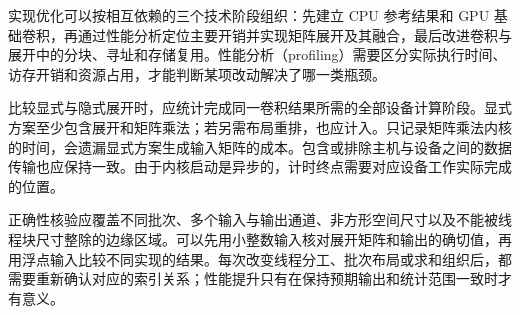 实现优化可以按相互依赖的三个技术阶段组织：先建立 CPU 参考结果和 GPU 基础卷积，再通过性能分析定位主要开销并实现矩阵展开及其融合，最后改进卷积与展开中的分块、寻址和存储复用。性能分析（profiling）需要区分实际执行时间、访存开销和资源占用，才能判断某项改动解决了哪一类瓶颈。

比较显式与隐式展开时，应统计完成同一卷积结果所需的全部设备计算阶段。显式方案至少包含展开和矩阵乘法；若另需布局重排，也应计入。只记录矩阵乘法内核的时间，会遗漏显式方案生成输入矩阵的成本。包含或排除主机与设备之间的数据传输也应保持一致。由于内核启动是异步的，计时终点需要对应设备工作实际完成的位置。

正确性核验应覆盖不同批次、多个输入与输出通道、非方形空间尺寸以及不能被线程块尺寸整除的边缘区域。可以先用小整数输入核对展开矩阵和输出的确切值，再用浮点输入比较不同实现的结果。每次改变线程分工、批次布局或求和组织后，都需要重新确认对应的索引关系；性能提升只有在保持预期输出和统计范围一致时才有意义。
